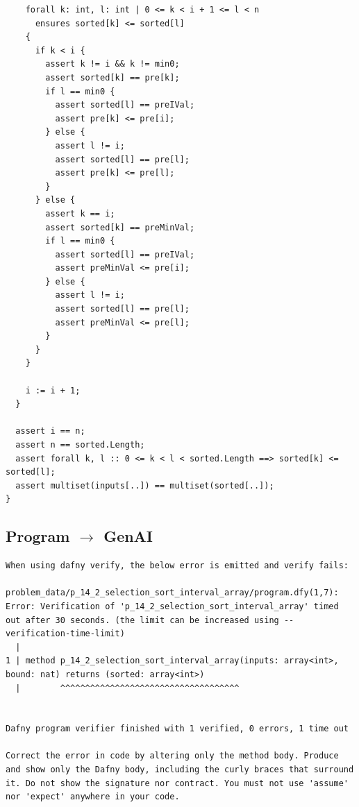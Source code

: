 \documentclass{article}
\begin{document}
\begin{lstlisting}
    forall k: int, l: int | 0 <= k < i + 1 <= l < n
      ensures sorted[k] <= sorted[l]
    {
      if k < i {
        assert k != i && k != min0;
        assert sorted[k] == pre[k];
        if l == min0 {
          assert sorted[l] == preIVal;
          assert pre[k] <= pre[i];
        } else {
          assert l != i;
          assert sorted[l] == pre[l];
          assert pre[k] <= pre[l];
        }
      } else {
        assert k == i;
        assert sorted[k] == preMinVal;
        if l == min0 {
          assert sorted[l] == preIVal;
          assert preMinVal <= pre[i];
        } else {
          assert l != i;
          assert sorted[l] == pre[l];
          assert preMinVal <= pre[l];
        }
      }
    }

    i := i + 1;
  }

  assert i == n;
  assert n == sorted.Length;
  assert forall k, l :: 0 <= k < l < sorted.Length ==> sorted[k] <= sorted[l];
  assert multiset(inputs[..]) == multiset(sorted[..]);
}
\end{lstlisting}
\subsection*{Program $\rightarrow$ GenAI}
\begin{lstlisting}
When using dafny verify, the below error is emitted and verify fails:

problem_data/p_14_2_selection_sort_interval_array/program.dfy(1,7): Error: Verification of 'p_14_2_selection_sort_interval_array' timed out after 30 seconds. (the limit can be increased using --verification-time-limit)
  |
1 | method p_14_2_selection_sort_interval_array(inputs: array<int>, bound: nat) returns (sorted: array<int>)
  |        ^^^^^^^^^^^^^^^^^^^^^^^^^^^^^^^^^^^^


Dafny program verifier finished with 1 verified, 0 errors, 1 time out

Correct the error in code by altering only the method body. Produce and show only the Dafny body, including the curly braces that surround it. Do not show the signature nor contract. You must not use 'assume' nor 'expect' anywhere in your code.
\end{lstlisting}
\end{document}
